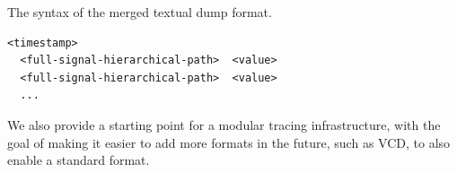 

\begin{listing}[ht]
    \caption{The syntax of the merged textual dump format.}
    \label{listing:merged-syntax}
    \centering
    \begin{minipage}{0.6\textwidth}
        \begin{verbatim}
<timestamp>
  <full-signal-hierarchical-path>  <value>
  <full-signal-hierarchical-path>  <value>
  ...
            \end{verbatim}
    \end{minipage}
\end{listing}

We also provide a starting point for a modular tracing infrastructure, with the goal of making it easier to add more formats in the future, such as VCD, to also enable a standard format.

